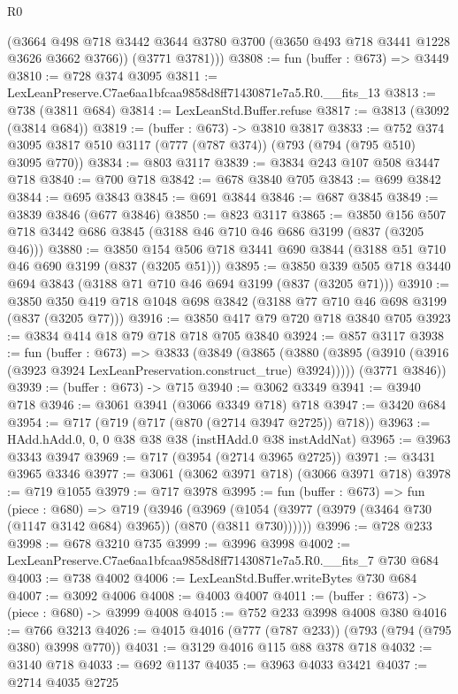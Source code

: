 \begin{lexlean}{R0}
\begin{coremodule}
        (@3664 @498 @718 @3442 @3644 @3780 @3700 (@3650 @493 @718 @3441 @1228 @3626 @3662 @3766))
        (@3771 @3781)))
@3808 := fun (buffer : @673) => @3449
@3810 := @728 @374 @3095
@3811 := LexLeanPreserve.C7ae6aa1bfcaa9858d8ff71430871e7a5.R0.__fits_13
@3813 := @738 (@3811 @684)
@3814 := LexLeanStd.Buffer.refuse
@3817 := @3813 (@3092 (@3814 @684))
@3819 := (buffer : @673) -> @3810 @3817
@3833 := @752 @374 @3095 @3817 @510 @3117 (@777 (@787 @374)) (@793 (@794 (@795 @510) @3095 @770))
@3834 := @803 @3117
@3839 := @3834 @243 @107 @508 @3447 @718
@3840 := @700 @718
@3842 := @678 @3840 @705
@3843 := @699 @3842
@3844 := @695 @3843
@3845 := @691 @3844
@3846 := @687 @3845
@3849 := @3839 @3846 (@677 @3846)
@3850 := @823 @3117
@3865 := @3850 @156 @507 @718 @3442 @686 @3845 (@3188 @46 @710 @46 @686 @3199 (@837 (@3205 @46)))
@3880 := @3850 @154 @506 @718 @3441 @690 @3844 (@3188 @51 @710 @46 @690 @3199 (@837 (@3205 @51)))
@3895 := @3850 @339 @505 @718 @3440 @694 @3843 (@3188 @71 @710 @46 @694 @3199 (@837 (@3205 @71)))
@3910 := @3850 @350 @419 @718 @1048 @698 @3842 (@3188 @77 @710 @46 @698 @3199 (@837 (@3205 @77)))
@3916 := @3850 @417 @79 @720 @718 @3840 @705
@3923 := @3834 @414 @18 @79 @718 @718 @705 @3840
@3924 := @857 @3117
@3938 := fun (buffer : @673) =>
  @3833
    (@3849
      (@3865 (@3880 (@3895 (@3910 (@3916 (@3923 @3924 LexLeanPreservation.construct_true) @3924)))))
      (@3771 @3846))
@3939 := (buffer : @673) -> @715
@3940 := @3062 @3349
@3941 := @3940 @718
@3946 := @3061 @3941 (@3066 @3349 @718) @718
@3947 := @3420 @684
@3954 := @717 (@719 (@717 (@870 (@2714 @3947 @2725)) @718))
@3963 := HAdd.hAdd.{0, 0, 0} @38 @38 @38 (instHAdd.{0} @38 instAddNat)
@3965 := @3963 @3343 @3947
@3969 := @717 (@3954 (@2714 @3965 @2725))
@3971 := @3431 @3965 @3346
@3977 := @3061 (@3062 @3971 @718) (@3066 @3971 @718)
@3978 := @719 @1055
@3979 := @717 @3978
@3995 := fun (buffer : @673) =>
  fun (piece : @680) =>
  @719
    (@3946
      (@3969 (@1054 (@3977 (@3979 (@3464 @730 (@1147 @3142 @684) @3965)) (@870 (@3811 @730))))))
@3996 := @728 @233
@3998 := @678 @3210 @735
@3999 := @3996 @3998
@4002 := LexLeanPreserve.C7ae6aa1bfcaa9858d8ff71430871e7a5.R0.__fits_7 @730 @684
@4003 := @738 @4002
@4006 := LexLeanStd.Buffer.writeBytes @730 @684
@4007 := @3092 @4006
@4008 := @4003 @4007
@4011 := (buffer : @673) -> (piece : @680) -> @3999 @4008
@4015 := @752 @233 @3998 @4008 @380
@4016 := @766 @3213
@4026 := @4015 @4016 (@777 (@787 @233)) (@793 (@794 (@795 @380) @3998 @770))
@4031 := @3129 @4016 @115 @88 @378 @718
@4032 := @3140 @718
@4033 := @692 @1137
@4035 := @3963 @4033 @3421
@4037 := @2714 @4035 @2725

\end{coremodule}
\end{lexlean}
